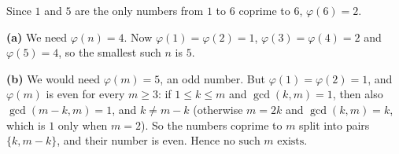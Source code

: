 Since $1$ and $5$ are the only numbers from $1$ to $6$ coprime to $6$, $\varphi(6)=2$.

\textbf{(a)} We need $\varphi(n)=4$. Now $\varphi(1)=\varphi(2)=1$, $\varphi(3)=\varphi(4)=2$ and $\varphi(5)=4$, so the smallest such $n$ is $\boxed{5}$.

\textbf{(b)} We would need $\varphi(m)=5$, an odd number. But $\varphi(1)=\varphi(2)=1$, and $\varphi(m)$ is even for every $m\ge3$: if $1\le k\le m$ and $\gcd(k,m)=1$, then also $\gcd(m-k,m)=1$, and $k\ne m-k$ (otherwise $m=2k$ and $\gcd(k,m)=k$, which is $1$ only when $m=2$). So the numbers coprime to $m$ split into pairs $\{k,m-k\}$, and their number is even. Hence $\boxed{\text{no such } m \text{ exists}}$.
